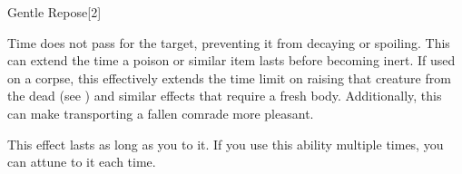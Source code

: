 \begin{spellsection}{Gentle Repose}[2]

\begin{spellcontent}

\begin{spelltargetinginfo}



\end{spelltargetinginfo}


\begin{spelleffects}



\spelleffect
Time does not pass for the target, preventing it from decaying or spoiling.
This can extend the time a poison or similar item lasts before becoming inert.
If used on a corpse, this effectively extends the time limit on raising that creature from the dead (see ) and similar effects that require a fresh body.
Additionally, this can make transporting a fallen comrade more pleasant.

This effect lasts as long as you  to it.
If you use this ability multiple times, you can attune to it each time.








\end{spelleffects}

\end{spellcontent}
\begin{spellfooter}


\end{spellfooter}
\begin{spellsubcontent}


\end{spellsubcontent}
\end{spellsection}


